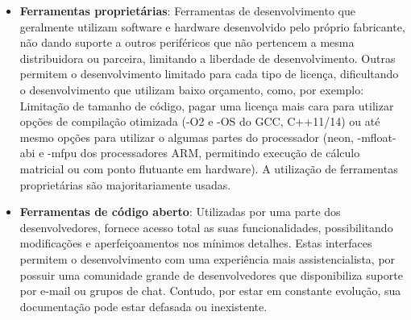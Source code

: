 \begin{itemize}
 \item \textbf{Ferramentas proprietárias}: Ferramentas de desenvolvimento que geralmente utilizam software e hardware desenvolvido pelo próprio fabricante, não dando suporte a outros periféricos que não pertencem a mesma distribuidora ou parceira, limitando a liberdade de desenvolvimento. Outras permitem o desenvolvimento limitado para cada tipo de licença, dificultando o desenvolvimento que utilizam baixo orçamento, como, por exemplo: Limitação de tamanho de código\cite{simplicity}, pagar uma licença mais cara para utilizar opções de compilação otimizada (-O2 e -OS do GCC, C++11/14)\cite{armdeveloper} ou até mesmo opções para utilizar o algumas partes do processador (neon, -mfloat-abi e -mfpu dos processadores ARM, permitindo execução de cálculo matricial ou com ponto flutuante em hardware)\cite{neon}. A utilização de ferramentas proprietárias são majoritariamente usadas.

 \item \textbf{Ferramentas de código aberto}: Utilizadas por uma parte dos desenvolvedores, fornece acesso total as suas funcionalidades, possibilitando modificações e aperfeiçoamentos nos mínimos detalhes. Estas interfaces permitem o desenvolvimento com uma experiência mais assistencialista, por possuir uma comunidade grande de desenvolvedores que disponibiliza suporte por e-mail ou grupos de chat. Contudo, por estar em constante evolução, sua documentação pode estar defasada ou inexistente.

\end{itemize}

